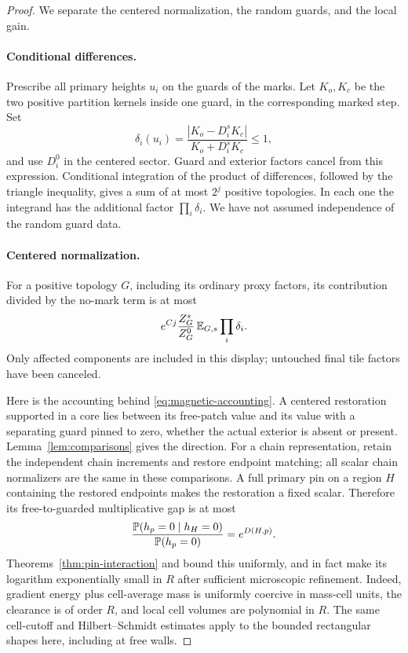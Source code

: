 \begin{proof}
We separate the centered normalization, the random guards, and the
local gain.

\paragraph{Conditional differences.}
Prescribe all primary heights \(u_i\) on the guards of the marks.
Let \(K_o,K_c\) be the two positive partition kernels inside one
guard, in the corresponding marked step. Set
\[
 \delta_i(u_i)=
 \frac{|K_o-D_i^sK_c|}{K_o+D_i^sK_c}\le1,
\]
and use \(D_i^0\) in the centered sector. Guard and exterior factors
cancel from this expression. Conditional integration of the product
of differences, followed by the triangle inequality, gives a sum
of at most \(2^j\) positive topologies. In each one the integrand
has the additional factor \(\prod_i\delta_i\). We have not assumed
independence of the random guard data.

\paragraph{Centered normalization.}
For a positive topology \(G\), including its ordinary proxy factors,
its contribution divided by the no-mark term is at most
\begin{equation}\label{eq:magnetic-accounting}
 e^{Cj}\frac{Z_G^s}{Z_G^0}\,
                  \mathbb E_{G,s}\prod_i\delta_i.
\end{equation}
Only affected components are included in this display; untouched
final tile factors have been canceled.

Here is the accounting behind \eqref{eq:magnetic-accounting}.
A centered restoration supported in a core lies between its
free-patch value and its value with a separating guard pinned to
zero, whether the actual exterior is absent or present.
Lemma~\ref{lem:comparisons} gives the direction. For a chain
representation, retain the independent chain increments and
restore endpoint matching; all scalar chain normalizers are the
same in these comparisons. A full primary pin on a region \(H\)
containing the restored endpoints makes the restoration a fixed
scalar. Therefore its free-to-guarded multiplicative gap is at
most
\[
 \frac{\mathbb P(h_p=0\mid h_H=0)}{\mathbb P(h_p=0)}
                         =e^{D(H,p)}.
\]
Theorems~\ref{thm:pin-interaction} and
 bound this uniformly, and in fact
make its logarithm exponentially small in \(R\) after sufficient
microscopic refinement. Indeed, gradient energy plus cell-average
mass is uniformly coercive in mass-cell units, the clearance is
of order \(R\), and local cell volumes are polynomial in \(R\).
The same cell-cutoff and Hilbert--Schmidt estimates apply to the
bounded rectangular shapes here, including at free walls.


\end{proof}
